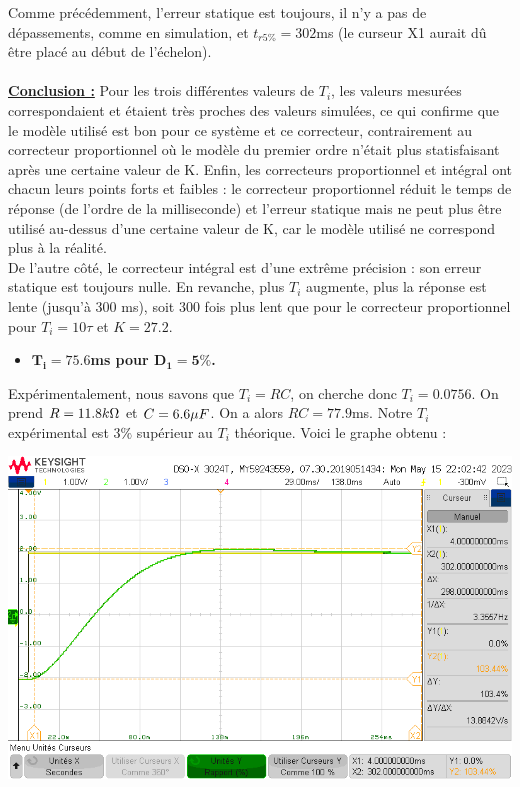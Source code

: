 \documentclass[12pt]{article}
\begin{document}
Comme précédemment, l'erreur statique est toujours, il n'y a pas de dépassements, comme en simulation, et $t_{r5\%} = 302$ms (le curseur X1 aurait dû être placé au début de l'échelon). 
\\\\\underline{\bf Conclusion :} Pour les trois différentes valeurs de $T_i$, les valeurs mesurées correspondaient et étaient très proches des valeurs simulées, ce qui confirme que le modèle utilisé est bon pour ce système et ce correcteur, contrairement au correcteur proportionnel où le modèle du premier ordre n'était plus statisfaisant après une certaine valeur de K.
Enfin, les correcteurs proportionnel et intégral ont chacun leurs points forts et faibles : le correcteur proportionnel réduit le temps de réponse (de l'ordre de la milliseconde) et l'erreur statique mais ne peut plus être utilisé au-dessus d'une certaine valeur de K, car le modèle utilisé ne correspond plus à la réalité.
\\De l'autre côté, le correcteur intégral est d'une extrême précision : son erreur statique est toujours nulle. En revanche, plus $T_i$ augmente, plus la réponse est lente (jusqu'à 300 ms), soit 300 fois plus lent que pour le correcteur proportionnel pour $T_i = 10\tau$ et $K = 27.2$.
\newpage
\begin{itemize}
    \item \large $\mathbf{T_i = 75.6}$\bf ms pour $\mathbf{D_1 = 5\%}$.
\end{itemize}
Expérimentalement, nous savons que $T_i = RC$, on cherche donc $T_i = 0.0756$. On prend $R=11.8 \space k\Omega$ et $C = 6.6\space \mu F$. On a alors $RC = 77.9$ms. Notre $T_i$ expérimental est 3$\%$ supérieur au $T_i$ théorique.
Voici le graphe obtenu : 
\begin{center}
    \includegraphics[width = 16 cm]{TP3/Syst_1/I/dep-syst1-ti=0.07788.png}
\end{center}
\end{document}
